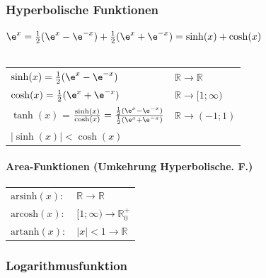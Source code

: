 			\subsubsection{Hyperbolische Funktionen}
			$\e^x = \frac{1}{2} (\e^x - \e^{-x}) + \frac{1}{2} (\e^x + \e^{-x}) = \sinh(x) + \cosh(x)$ \\
			\\
			\begin{tabular}{ll}
			$\sinh(x) = \frac{1}{2} (\e^x - \e^{-x})$ & $\mathbb{R} \rightarrow \mathbb{R}$ \\
			$\cosh(x) = \frac{1}{2} (\e^x + \e^{-x})$ & $\mathbb{R} \rightarrow [1; \infty)$ \\
			$\tanh(x)$ = $\frac{\sinh(x)}{\cosh(x)} = \frac{\frac{1}{2} (\e^x - \e^{-x})}{\frac{1}{2} (\e^x + \e^{-x})}$ & $\mathbb{R} \rightarrow (-1; 1)$ \\	
		
			$\vert \sinh(x) \vert < \cosh(x)$	& \\
			\end{tabular}
			
			
			\paragraph{Area-Funktionen (Umkehrung Hyperbolische. F.)}
			\begin{tabular}{ll}
			$\mathrm{arsinh}(x): $ &  $\mathbb{R} \rightarrow \mathbb{R}$ \\
			$\mathrm{arcosh}(x): $ & $[1; \infty) \rightarrow \mathbb{R}^+_0$  \\
			$\mathrm{artanh}(x): $ & $ \vert x \vert < 1 \rightarrow \mathbb{R} $ \\
			
			\end{tabular}
			
			
			\subsubsection{Logarithmusfunktion}
				
